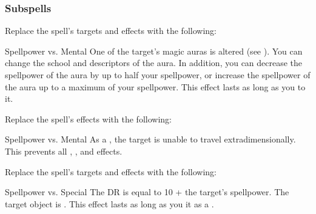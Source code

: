 \subsubsection{Subspells}
Replace the spell's targets and effects with the following:
\begin{spellcontent}
\begin{augmenttargetinginfo}
\end{augmenttargetinginfo}
\begin{augmenteffects}
\begin{spellattack}{Spellpower vs. Mental}
\spellsuccess
One of the target's magic auras is altered (see ).
You can change the school and descriptors of the aura.
In addition, you can decrease the spellpower of the aura by up to half your spellpower, or increase the spellpower of the aura up to a maximum of your spellpower.
This effect lasts as long as you  to it.
\end{spellattack}
\end{augmenteffects}
\end{spellcontent}
Replace the spell's effects with the following:
\begin{spellcontent}
\begin{augmenteffects}
\begin{spellattack}{Spellpower vs. Mental}
\spellsuccess
As a , the target is unable to travel extradimensionally.
This prevents all , , and  effects.
\end{spellattack}
\end{augmenteffects}
\end{spellcontent}
Replace the spell's targets and effects with the following:
\begin{spellcontent}
\begin{augmenttargetinginfo}
\end{augmenttargetinginfo}
\begin{augmenteffects}
\begin{spellattack}{Spellpower vs. Special}
\spellspecial
The DR is equal to 10 + the target's spellpower.
\spellsuccess
The target object is .
This effect lasts as long as you  it as a .
\end{spellattack}
\end{augmenteffects}
\end{spellcontent}
